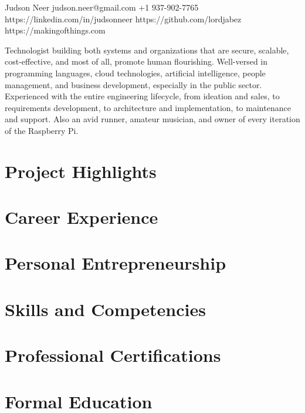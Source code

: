 \documentclass{article}
\begin{document}
\header
  {Judson Neer}
  {judson.neer@gmail.com}
  {+1 937-902-7765}
  {https://linkedin.com/in/judsonneer}
  {https://github.com/lordjabez}
  {https://makingofthings.com}

Technologist building both systems and organizations that are secure, scalable, cost-effective, and most of all, promote human flourishing. Well-versed in programming languages, cloud technologies, artificial intelligence, people management, and business development, especially in the public sector. Experienced with the entire engineering lifecycle, from ideation and sales, to requirements development, to architecture and implementation, to maintenance and support. Also an avid runner, amateur musician, and owner of every iteration of the Raspberry Pi.


\section{Project Highlights}




\pagebreak

\section{Career Experience}




\section{Personal Entrepreneurship}




\section{Skills and Competencies}




\vspace{5mm}

\section{Professional Certifications}




\vspace{5mm}

\section{Formal Education}




\credits
\end{document}
